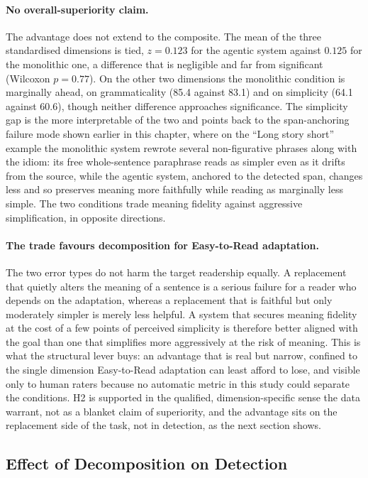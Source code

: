 \paragraph{No overall-superiority claim.} The advantage does not extend to the composite. The mean of the three standardised dimensions is tied, $z = 0.123$ for the agentic system against $0.125$ for the monolithic one, a difference that is negligible and far from significant (Wilcoxon $p = 0.77$). On the other two dimensions the monolithic condition is marginally ahead, on grammaticality (85.4 against 83.1) and on simplicity (64.1 against 60.6), though neither difference approaches significance. The simplicity gap is the more interpretable of the two and points back to the span-anchoring failure mode shown earlier in this chapter, where on the ``Long story short'' example the monolithic system rewrote several non-figurative phrases along with the idiom: its free whole-sentence paraphrase reads as simpler even as it drifts from the source, while the agentic system, anchored to the detected span, changes less and so preserves meaning more faithfully while reading as marginally less simple. The two conditions trade meaning fidelity against aggressive simplification, in opposite directions.

\paragraph{The trade favours decomposition for Easy-to-Read adaptation.} The two error types do not harm the target readership equally. A replacement that quietly alters the meaning of a sentence is a serious failure for a reader who depends on the adaptation, whereas a replacement that is faithful but only moderately simpler is merely less helpful. A system that secures meaning fidelity at the cost of a few points of perceived simplicity is therefore better aligned with the goal than one that simplifies more aggressively at the risk of meaning. This is what the structural lever buys: an advantage that is real but narrow, confined to the single dimension Easy-to-Read adaptation can least afford to lose, and visible only to human raters because no automatic metric in this study could separate the conditions. H2 is supported in the qualified, dimension-specific sense the data warrant, not as a blanket claim of superiority, and the advantage sits on the replacement side of the task, not in detection, as the next section shows.

\subsection{Effect of Decomposition on Detection}
\label{subsec:rq2-pipeline-detection}

